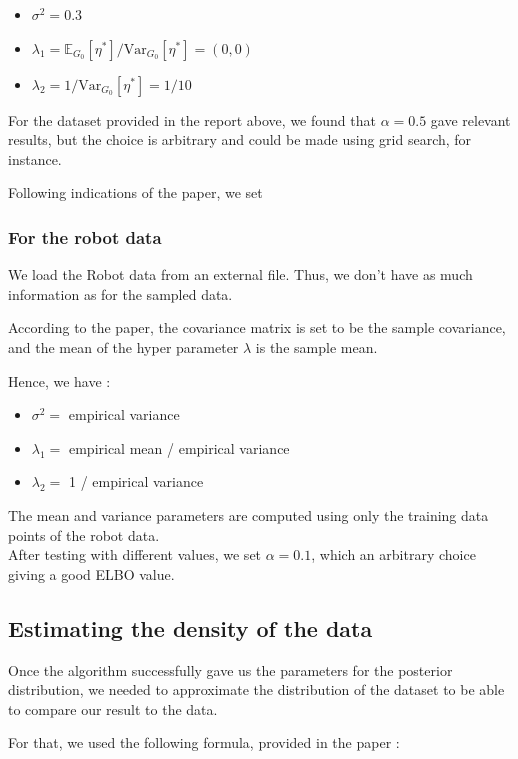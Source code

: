 \documentclass{article}
\begin{document}
\begin{itemize}
    \item $\sigma^2 = 0.3$
    \item $\lambda_1 = \mathbb{E}_{G_0}[\eta^*] / \text{Var}_{G_0}[\eta^*] = (0, 0)$
    \item $\lambda_2 = 1 / \text{Var}_{G_0}[\eta^*] = 1/10$
\end{itemize}

For the dataset provided in the report above, we found that $\alpha = 0.5$ gave relevant results, but the choice is arbitrary and could be made using grid search, for instance.

Following indications of the paper, we set $$$$

\subsubsection{For the robot data}
We load the Robot data from an external file. Thus, we don't have as much information as for the sampled data.

According to the paper, the covariance matrix is set to be the sample covariance, and the mean of the hyper parameter $\lambda$ is the
sample mean.

Hence, we have :

\begin{itemize}
    \item $\sigma^2 = $ empirical variance
    \item $\lambda_1 =$ empirical mean / empirical variance
    \item $\lambda_2 =$ 1 / empirical variance
\end{itemize}

The mean and variance parameters are computed using only the training data points of the robot data. \\

After testing with different values, we set $\alpha = 0.1$, which an arbitrary choice giving a good ELBO value.


\subsection{Estimating the density of the data}

Once the algorithm successfully gave us the parameters for the posterior distribution, we needed to approximate the distribution of the dataset to be able to compare our result to the data.

For that, we used the following formula, provided in the paper :
\end{document}
